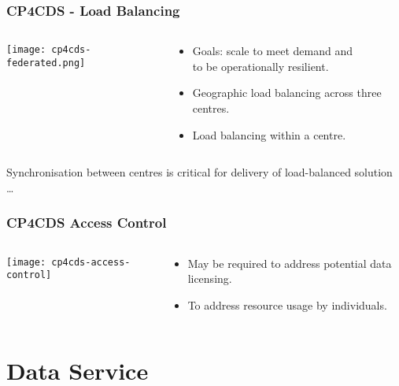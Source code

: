 \documentclass{beamer}
\begin{document}
\begin{frame}
\frametitle<presentation>{CP4CDS - Load Balancing}
  \begin{columns}[c]
    \begin{column}{.5\textwidth}
      \centering
      \texttt{[image: cp4cds-federated.png]}
    \end{column}
    \begin{column}{.5\textwidth}
      \begin{itemize}
        \item Goals: scale to meet demand and\\
            to be operationally resilient.
        \item Geographic load balancing across three centres.
        \item Load balancing within a centre.
      \end{itemize}
    \end{column}
  \end{columns}
  \vfill
  Synchronisation between centres is critical for delivery of load-balanced solution \ldots

\end{frame}

\begin{frame}
\frametitle<presentation>{CP4CDS Access Control}

  \begin{columns}[c]
    \begin{column}{.5\textwidth}
      \centering
      \texttt{[image: cp4cds-access-control]}
    \end{column}
    \begin{column}{.5\textwidth}
      \begin{itemize}
        \item May be required to address potential data licensing.
        \item To address resource usage by individuals.
      \end{itemize}
    \end{column}
  \end{columns}

\end{frame}

\section{Data Service}
\end{document}
